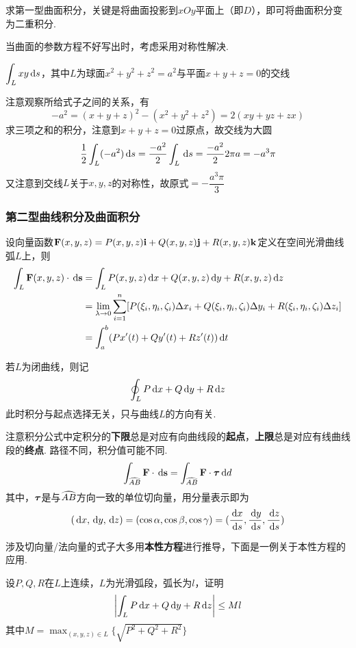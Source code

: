 求第一型曲面积分，关键是将曲面投影到$xOy$平面上（即$D$），即可将曲面积分变为二重积分.
\par 当曲面的参数方程不好写出时，考虑采用对称性解决.
\begin{example}
$\displaystyle\int_Lxy\,\mathrm{d} s$，其中$L$为球面$x^2+y^2+z^2=a^2$与平面$x+y+z=0$的交线
\end{example}
\begin{analysis}
注意观察所给式子之间的关系，有
\[-a^2=(x+y+z)^2-(x^2+y^2+z^2)=2(xy+yz+zx)\]
求三项之和的积分，注意到$x+y+z=0$过原点，故交线为大圆
\[\frac{1}{2}\int_L(-a^2)\,\mathrm{d} s=\frac{-a^2}{2}\int_L\,\mathrm{d} s=\frac{-a^2}{2}2\pi a=-a^3\pi\]
又注意到交线$L$关于$x,y,z$的对称性，故原式$=-\dfrac{a^3\pi}{3}$
\end{analysis}

\subsubsection{第二型曲线积分及曲面积分}
\begin{definition}[第二型曲线积分]
设向量函数$\mathbf{F}(x,y,z)=P(x,y,z)\mathbf{i}+Q(x,y,z)\mathbf{j}+R(x,y,z)\mathbf{k}$定义在空间光滑曲线弧$L$上，则
\[\begin{aligned}
\int_L\mathbf{F}(x,y,z)\cdot\,\mathrm{d}\mathbf{s}&=\int_LP(x,y,z)\,\mathrm{d} x+Q(x,y,z)\,\mathrm{d} y+R(x,y,z)\,\mathrm{d} z\\
&=\lim_{\lambda\to 0}\sum_{i=1}^n[P(\xi_i,\eta_i,\zeta_i)\Delta x_i+Q(\xi_i,\eta_i,\zeta_i)\Delta y_i+R(\xi_i,\eta_i,\zeta_i)\Delta z_i]\\
&=\int_a^b(Px'(t)+Qy'(t)+Rz'(t))\,\mathrm{d} t
\end{aligned}\]
\end{definition}
若$L$为闭曲线，则记
\[\oint_LP\,\mathrm{d} x+Q\,\mathrm{d} y+R\,\mathrm{d} z\]
此时积分与起点选择无关，只与曲线$L$的方向有关.
\par 注意积分公式中定积分的\textbf{下限}总是对应有向曲线段的\textbf{起点}，\textbf{上限}总是对应有线曲线段的\textbf{终点}.
路径不同，积分值可能不同.
\[\int_{\wideparen{AB}}\vF\cdot \diff\vs=\int_{\arc{AB}}\vF\cdot\vtau\diff d\]
其中，$\bm{\tau}$是与$\arc{AB}$方向一致的单位切向量，用分量表示即为
\[(\,\mathrm{d} x,\,\mathrm{d} y,\,\mathrm{d} z)=(\cos\alpha,\cos\beta,\cos\gamma)=(\frac{\,\mathrm{d} x}{\,\mathrm{d} s},\frac{\,\mathrm{d} y}{\,\mathrm{d} s},\frac{\,\mathrm{d} z}{\,\mathrm{d} s})\]
\par 涉及切向量/法向量的式子大多用\textbf{本性方程}进行推导，下面是一例关于本性方程的应用.
\begin{example}
设$P,Q,R$在$L$上连续，$L$为光滑弧段，弧长为$l$，证明
\[\left|\int_LP\,\mathrm{d} x+Q\,\mathrm{d} y+R\,\mathrm{d} z\right|\leq Ml\]
其中$M=\max_{(x,y,z)\in L}\{\sqrt{P^2+Q^2+R^2}\}$
\end{example}
